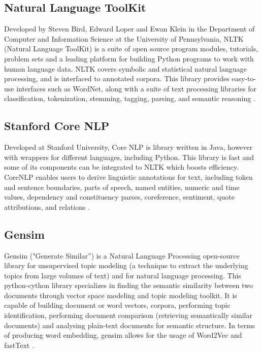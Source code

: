         \subsection{Natural Language ToolKit}

        \par Developed by Steven Bird, Edward Loper and Ewan Klein in the Department of Computer and Information Science at the University of Pennsylvania, NLTK (Natural Language ToolKit) is a suite of open source program modules, tutorials, problem sets and a leading platform for building Python programs to work with human language data. NLTK covers symbolic and statistical natural language processing, and is interfaced to annotated corpora. This library provides easy-to-use interfaces such as WordNet, along with a suite of text processing libraries for classification, tokenization, stemming, tagging, parsing, and semantic reasoning \cite{Loper2002}. 

        \subsection{Stanford Core NLP}

        \par Developed at Stanford University, Core NLP is library written in Java, however with wrappers for different languages, including Python. This library is fast and some of its components can be integrated to NLTK which boosts efficiency. CoreNLP enables users to derive linguistic annotations for text, including token and sentence boundaries, parts of speech, named entities, numeric and time values, dependency and constituency parses, coreference, sentiment, quote attributions, and relations \cite{Manning2015}.


        \subsection{Gensim}

        \par Gensim ("Generate Similar”) is a Natural Language Processing open-source library for unsupervised topic modeling (a technique to extract the underlying topics from large volumes of text)  and for natural language processing. This python-cython library specializes in finding the semantic similarity between two documents through vector space modeling and topic modeling toolkit. It is capable of building document or word vectors, corpora, performing topic identification, performing document comparison (retrieving semantically similar documents) and analysing plain-text documents for semantic structure. In terms of producing word embedding, gensim allows for the usage of Word2Vec and fastText \cite{rehurek_lrec}.
        
